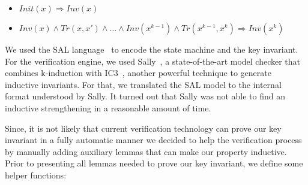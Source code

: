 \begin{itemize}
\item $Init(x) \Rightarrow Inv(x)$
\item $Inv(x) \wedge Tr(x,x') \wedge \ldots \wedge Inv(x^{k-1}) \wedge Tr(x^{k-1},x^{k}) \Rightarrow Inv(x^{k})$
\end{itemize}


We used the SAL language~\cite{bensalem2000overview,sal2} to encode
the state machine and the key invariant. For the verification engine,
we used Sally~\cite{sally}, a state-of-the-art model checker that
combines k-induction with IC3~\cite{Bradley11}, another powerful
technique to generate inductive invariants.  For that, we translated
the SAL model to the internal format understood by Sally.  It turned
out that Sally was not able to find an inductive strengthening in a
reasonable amount of time.


Since, it is not likely that current verification technology can prove
our key invariant in a fully automatic manner we decided to help the
verification process by manually adding auxiliary lemmas that can make
our property inductive.
%
Prior to presenting all lemmas needed to prove our key
invariant, we define some helper functions:

\begin{minipage}{\linewidth}
\vspace{3mm}
\vspace{3mm}
\end{minipage}


